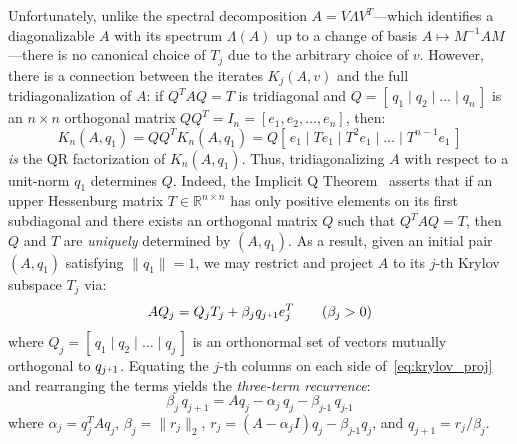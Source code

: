 \documentclass[12pt]{article}
\numberwithin{equation}{section}
\newcommand{\+}{%
	\raisebox{0.18ex}{\scaleobj{0.55}{+}}
}
\theoremstyle{definition}
\begin{document}
Unfortunately, unlike the spectral decomposition $A = V \Lambda V^T$---which identifies a diagonalizable $A$ with its spectrum $\Lambda(A)$ up to a change of basis $A \mapsto M^{-1} A M$---there is no canonical choice of $T_j$ due to the arbitrary choice of $v$. 
However, there is a connection between the iterates $K_j(A,v)$ and the full tridiagonalization of $A$: if $Q^T A Q = T$ is tridiagonal and $Q= [\, q_1 \mid q_2 \mid \dots \mid q_n \,]$ is an $n \times n$ orthogonal matrix $Q Q^T = I_n = [e_1, e_2, \dots, e_n]$, then:
\begin{equation}
	K_n(A, q_1) = Q Q^T K_n(A, q_1) = Q[ \, e_1 \mid T e_1 \mid T^2 e_1 \mid \dots \mid T^{n-1} e_1 \, ]
\end{equation}
\emph{is} the QR factorization of $K_n(A, q_1)$. Thus, tridiagonalizing $A$ with respect to a unit-norm $q_1$ determines $Q$. 
Indeed, the Implicit Q Theorem~\cite{golub2013matrix} asserts that if an upper Hessenburg matrix $T \in \mathbb{R}^{n \times n}$ has only positive elements on its first subdiagonal and there exists an orthogonal matrix $Q$ such that $Q^T A Q = T$, then $Q$ and $T$ are \emph{uniquely} determined by $(A, q_1)$. 
As a result, given an initial pair $(A, q_1)$ satisfying $\lVert q_1 \rVert = 1$, we may restrict and project $A$ to its $j$-th Krylov subspace $T_j$ via: 
\begin{equation}\label{eq:krylov_proj}
	A Q_j = Q_j T_j + \beta_j q_{j\+1} e_{j}^T \quad\quad (\beta_j > 0)
\end{equation}
where $Q_j = [\, q_1 \mid q_2 \mid \dots \mid q_j \,]$ is an orthonormal set of vectors mutually orthogonal to $q_{j\+1}$.
Equating the $j$-th columns on each side of~\eqref{eq:krylov_proj} and rearranging the terms yields the \emph{three-term recurrence}: 
\begin{equation}\label{eq:three_term_rec}
	 \beta_{j} \, q_{j+1} = A q_j - \alpha_j \, q_j - \beta_{j\text{-}1} \, q_{j\text{-}1}  
\end{equation}
where $\alpha_j = q_j^T A q_j$, $\beta_j = \lVert r_j \rVert_2$, $r_j = (A - \alpha_j I)q_j - \beta_{j\text{-}1} q_j$, and $q_{j+1} = r_j / \beta_j$. 
\end{document}
